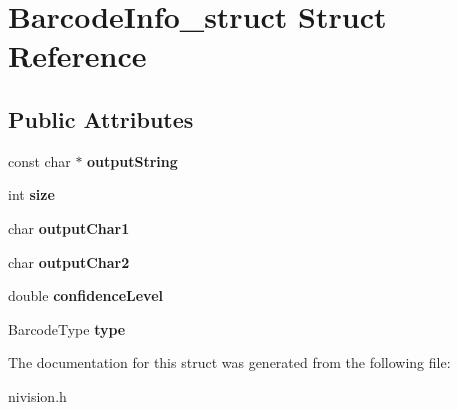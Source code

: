 \hypertarget{structBarcodeInfo__struct}{
\section{BarcodeInfo\_\-struct Struct Reference}
\label{structBarcodeInfo__struct}
}
\subsection*{Public Attributes}
\begin{DoxyCompactItemize}
\item 
\hypertarget{structBarcodeInfo__struct_ab185776e7a618cbd98d26ac6726ace01}{
const char $\ast$ {\bfseries outputString}}
\label{structBarcodeInfo__struct_ab185776e7a618cbd98d26ac6726ace01}

\item 
\hypertarget{structBarcodeInfo__struct_a1bcf8870fad45897861938e88889e2ff}{
int {\bfseries size}}
\label{structBarcodeInfo__struct_a1bcf8870fad45897861938e88889e2ff}

\item 
\hypertarget{structBarcodeInfo__struct_a27f2d0b60030e689236c43f314e12797}{
char {\bfseries outputChar1}}
\label{structBarcodeInfo__struct_a27f2d0b60030e689236c43f314e12797}

\item 
\hypertarget{structBarcodeInfo__struct_a3c3fa62a3cea157db2007e0fdfa1a469}{
char {\bfseries outputChar2}}
\label{structBarcodeInfo__struct_a3c3fa62a3cea157db2007e0fdfa1a469}

\item 
\hypertarget{structBarcodeInfo__struct_a0863171df66e08b2a949c18c838e4595}{
double {\bfseries confidenceLevel}}
\label{structBarcodeInfo__struct_a0863171df66e08b2a949c18c838e4595}

\item 
\hypertarget{structBarcodeInfo__struct_a280c5030ac56b2045b086345ed4bdf9d}{
BarcodeType {\bfseries type}}
\label{structBarcodeInfo__struct_a280c5030ac56b2045b086345ed4bdf9d}

\end{DoxyCompactItemize}


The documentation for this struct was generated from the following file:\begin{DoxyCompactItemize}
\item 
nivision.h\end{DoxyCompactItemize}
